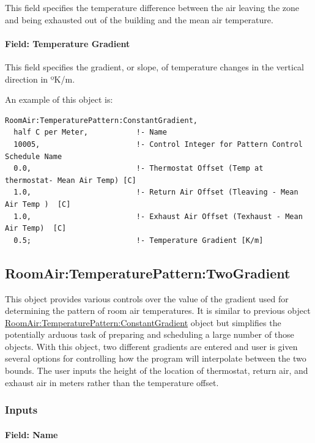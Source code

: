 This field specifies the temperature difference between the air leaving the zone and being exhausted out of the building and the mean air temperature.

\paragraph{Field: Temperature Gradient}\label{field-temperature-gradient}

This field specifies the gradient, or slope, of temperature changes in the vertical direction in ºK/m.

An example of this object is:

\begin{lstlisting}
RoomAir:TemperaturePattern:ConstantGradient,
  half C per Meter,           !- Name
  10005,                      !- Control Integer for Pattern Control Schedule Name
  0.0,                        !- Thermostat Offset (Temp at thermostat- Mean Air Temp) [C]
  1.0,                        !- Return Air Offset (Tleaving - Mean Air Temp )  [C]
  1.0,                        !- Exhaust Air Offset (Texhaust - Mean Air Temp)  [C]
  0.5;                        !- Temperature Gradient [K/m]
\end{lstlisting}

\subsection{RoomAir:TemperaturePattern:TwoGradient}\label{roomairtemperaturepatterntwogradient}

This object provides various controls over the value of the gradient used for determining the pattern of room air temperatures. It is similar to previous object \hyperref[roomairtemperaturepatternconstantgradient]{RoomAir:TemperaturePattern:ConstantGradient} object but simplifies the potentially arduous task of preparing and scheduling a large number of those objects. With this object, two different gradients are entered and user is given several options for controlling how the program will interpolate between the two bounds. The user inputs the height of the location of thermostat, return air, and exhaust air in meters rather than the temperature offset.

\subsubsection{Inputs}\label{inputs-3-031}

\paragraph{Field: Name}\label{field-name-3-027}


